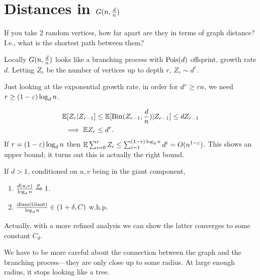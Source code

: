 \section{Distances in $G(n,\frac{d}{n})$}

If you take 2 random vertices, how far apart are they in terms of graph distance? I.e., what is the shortest path between them?

Locally $G(n,\frac{d}{n})$ looks like a branching process with $\operatorname{Pois}(d)$ offsprint, growth rate $d$. Letting $Z_r$ be the number of vertices up to depth $r$, $Z_r\sim d^r$.

Just looking at the exponential growth rate, in order for $d^r \ge \varepsilon n$, we need $r\ge (1-\varepsilon)\log_d n$. 

\begin{align}
\mathbb{E}[Z_r|Z_{r-1}] &\le \mathbb{E}[\operatorname{Bin}(Z_{r-1}, \frac{d}{n})|Z_{r-1}]\le d Z_{r-1}\\
\implies
\mathbb{E} Z_r &\le d^r.
\end{align}
If $r=(1-\varepsilon)\log_d n$ then $\mathbb{E}\sum_{i=0}^{r} Z_i\le \sum_{i=1}^{(1-\varepsilon)\log_dn}d^i = O(n^{1-\varepsilon})$.
This shows an upper bound; it turns out this is actually the right bound.
\begin{thm}
If $d>1$, conditioned on $u,v$ being in the giant component,
\begin{enumerate}
\item
$\frac{d(u,v)}{\log_d n}\xrightarrow{p} 1$.
\item
$\frac{\operatorname{diam}\left( \text{Giant} \right)}{\log_d n}\in (1+\delta, C)$ w.h.p. 
\end{enumerate}
\end{thm}
Actually, with a more refined analysis we can show the latter converges to some constant $C_d$.

We have to be more careful about the connection between the graph and the branching process---they are only close up to some radius. At large enough radius, it stops looking like a tree.

